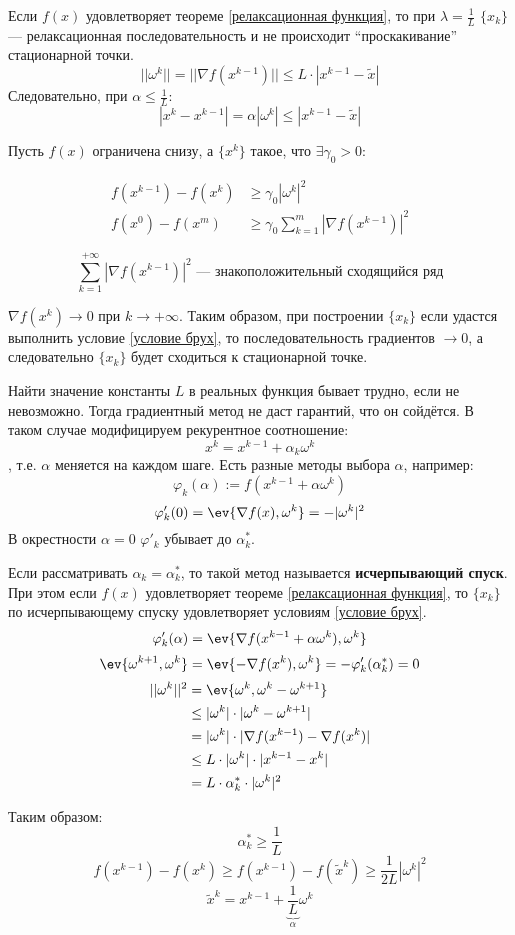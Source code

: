 Если \(f(x)\) удовлетворяет теореме \ref{релаксационная функция}, то при \(\lambda = \frac{1}{L}\) \(\{x_k\}\) --- релаксационная последовательность и не происходит ``проскакивание'' стационарной точки.
\[||\omega^k|| = ||\nabla f(x^{k - 1})|| \leq L \cdot |x^{k - 1} - \tilde{x}|\]
Следовательно, при \(\alpha \leq \frac{1}{L}\):
\[|x^k - x^{k - 1}| = \alpha |\omega^k| \leq |x^{k - 1} - \tilde{x}|\]

Пусть \(f(x)\) ограничена снизу, а \(\{x^k\}\) такое, что \(\exists \gamma_0 > 0\):

\begin{align}
    f(x^{k - 1}) - f(x^k) & \geq \gamma_0 |\omega^k| ^2 \label{условие брух}     \\
    f(x^0) - f(x^m)       & \geq \gamma_0 \sum_{k = 1}^m |\nabla f(x^{k - 1})|^2
\end{align}

\[\sum_{k = 1}^{+\infty} |\nabla f(x^{k - 1})|^2 \text{ --- знакоположительный сходящийся ряд}\]

\(\nabla f(x^k) \to 0\) при \(k \to +\infty\). Таким образом, при построении \(\{x_k\}\) если удастся выполнить условие \eqref{условие брух}, то последовательность градиентов \( \to 0\), а следовательно \(\{x_k\}\) будет сходиться к стационарной точке.

Найти значение константы \(L\) в реальных функция бывает трудно, если не невозможно. Тогда градиентный метод не даст гарантий, что он сойдётся. В таком случае модифицируем рекурентное соотношение:
\begin{equation}
    x^k = x^{k - 1} + \alpha_k \omega^k
    \label{измененная рекурента}
\end{equation}
, т.е. \(\alpha\) меняется на каждом шаге. Есть разные методы выбора \(\alpha\), например:
\[\varphi_k(\alpha) := f(x^{k - 1} + \alpha \omega^k)\]
\[\varphi_k'(0) = \ev{\nabla f(x), \omega^k} = - |\omega^k|^2\]
В окрестности \(\alpha = 0\) \(\varphi'_k\) убывает до \(\alpha_k^*\).

Если рассматривать \(\alpha_k = \alpha_k^*\), то такой метод называется \textbf{исчерпывающий спуск}. При этом если \(f(x)\) удовлетворяет теореме \ref{релаксационная функция}, то \(\{x_k\}\) по исчерпывающему спуску удовлетворяет условиям \eqref{условие брух}.
\[\varphi_k'(\alpha) = \ev{\nabla f(x^{k - 1} + \alpha \omega^k), \omega^k}\]
\[\ev{\omega^{k + 1}, \omega^k} = \ev{ -\nabla f(x^k), \omega^k} = - \varphi_k' (\alpha^*_k) = 0\]
\begin{align*}
    ||\omega^k||^2 & = \ev{\omega^k, \omega^k - \omega^{k + 1}}               \\
                   & \leq |\omega^k| \cdot |\omega^k - \omega^{k + 1}|        \\
                   & = |\omega^k| \cdot |\nabla f(x^{k - 1}) - \nabla f(x^k)| \\
                   & \leq L \cdot |\omega^k| \cdot |x^{k - 1} - x^k|          \\
                   & = L \cdot \alpha_k^* \cdot |\omega^k|^2
\end{align*}

Таким образом:
\[\alpha_k^* \geq \frac{1}{L}\]
\[f(x^{k - 1}) - f(x^k) \geq f(x^{k - 1}) - f(\tilde{x}^k) \geq \frac{1}{2L} |\omega^k|^2\]
\[\tilde{x}^k = x^{k - 1} + \underbrace{\frac{1}{L}}_\alpha \omega^k\]